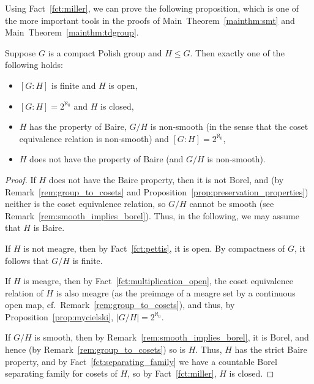 	Using Fact~\ref{fct:miller}, we can prove the following proposition, which is one of the more important tools in the proofs of Main~Theorem~\ref{mainthm:smt} and Main~Theorem~\ref{mainthm:tdgroup}.
	\begin{prop}
		\label{prop:trichotomy_for_groups}
		Suppose $G$ is a compact Polish group and $H\leq G$. Then exactly one of the following holds:
		\begin{itemize}
			\item
			$[G:H]$ is finite and $H$ is open,
			\item
			$[G:H]=2^{\aleph_0}$ and $H$ is closed,
			\item
			$H$ has the property of Baire, $G/H$ is non-smooth (in the sense that the coset equivalence relation is non-smooth) and $[G:H]=2^{\aleph_0}$,
			\item
			$H$ does not have the property of Baire (and $G/H$ is non-smooth).
		\end{itemize}
	\end{prop}
	\begin{proof}
		If $H$ does not have the Baire property, then it is not Borel, and (by Remark~\ref{rem:group_to_cosets} and Proposition~\ref{prop:preservation_properties}) neither is the coset equivalence relation, so $G/H$ cannot be smooth (see Remark~\ref{rem:smooth_implies_borel}). Thus, in the following, we may assume that $H$ is Baire.
		
		If $H$ is not meagre, then by Fact~\ref{fct:pettis}, it is open. By compactness of $G$, it follows that $G/H$ is finite.
		
		If $H$ is meagre, then by Fact~\ref{fct:multiplication_open}, the coset equivalence relation of $H$ is also meagre (as the preimage of a meagre set by a continuous open map, cf.\ Remark~\ref{rem:group_to_cosets}), and thus, by Proposition~\ref{prop:mycielski}, $\lvert G/H\rvert=2^{\aleph_0}$.
		
		If $G/H$ is smooth, then by Remark~\ref{rem:smooth_implies_borel}, it is Borel, and hence (by Remark~\ref{rem:group_to_cosets}) so is $H$. Thus, $H$ has the strict Baire property, and by Fact~\ref{fct:separating_family} we have a countable Borel separating family for cosets of $H$, so by Fact~\ref{fct:miller}, $H$ is closed.
	\end{proof}
	
